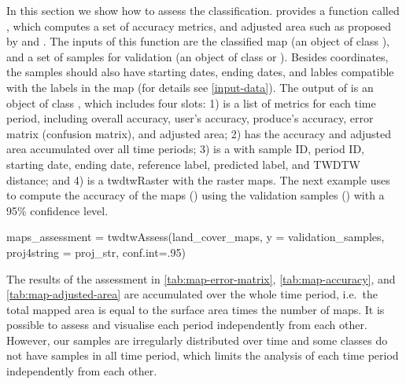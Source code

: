 \documentclass[article,shortnames]{jss}
\begin{document}
In this section we show how to assess the classification. 
provides a function called , which computes a set of
accuracy metrics, and adjusted area such as proposed by
\citet{Olofsson:2013} and \citet{Olofsson:2014}. The inputs of this
function are the classified map (an object of class ),
and a set of samples for validation (an object of class
 or ). Besides
coordinates, the samples should also have starting dates, ending dates,
and lables compatible with the labels in the map (for details see
\autoref{input-data}). The output of  is an object of
class , which includes four slots: 1)
 is a list of metrics for each time period,
including overall accuracy, user's accuracy, produce's accuracy, error
matrix (confusion matrix), and adjusted area; 2) 
has the accuracy and adjusted area accumulated over all time periods; 3)
 is a  with sample ID, period
ID, starting date, ending date, reference label, predicted label, and
TWDTW distance; and 4)  is a twdtwRaster with the raster maps.
The next example uses  to compute the accuracy of the
maps () using the validation samples
() with a 95\% confidence level.

\begin{CodeChunk}
\begin{CodeInput}
maps_assessment = twdtwAssess(land_cover_maps, y = validation_samples, 
  proj4string = proj_str, conf.int=.95)
\end{CodeInput}
\end{CodeChunk}

The results of the assessment in \autoref{tab:map-error-matrix},
\ref{tab:map-accuracy}, and \ref{tab:map-adjusted-area} are accumulated
over the whole time period, i.e.~the total mapped area is equal to the
surface area times the number of maps. It is possible to assess and
visualise each period independently from each other. However, our
samples are irregularly distributed over time and some classes do not
have samples in all time period, which limits the analysis of each time
period independently from each other.
\end{document}
